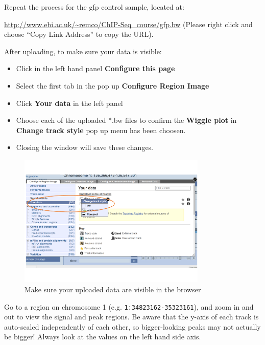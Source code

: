 \begin{steps}
Repeat the process for the gfp control sample, located at:

\url{http://www.ebi.ac.uk/~remco/ChIP-Seq_course/gfp.bw} (Please right click and choose ``Copy Link Address'' to copy the URL).

After uploading, to make sure your data is visible:
\begin{itemize}
	\item Click in the left hand panel \textbf{Configure this page}
        \item Select the first tab in the pop up \textbf{Configure Region Image}
        \item Click \textbf{Your data} in the left panel
        \item Choose each of the uploaded *.bw files to confirm the \textbf{Wiggle plot} in \textbf{Change track style} pop up menu has been choosen.
        \item Closing the window will save these changes.

\end{itemize}

\begin{figure}[H]
\centering
\includegraphics[width=0.8\textwidth]{ConfigureYourData.png}
\caption{Make sure your uploaded data are visible in the browser}
\label{fig:ConfigureYourData}
\end{figure}

Go to a region on chromosome 1 (e.g. \texttt{1:34823162-35323161}), and zoom in and out
to view the signal and peak regions. Be aware that the y-axis of each track is auto-scaled independently of each other,
so bigger-looking peaks may not actually be bigger! Always look at the values
on the left hand side axis.
\end{steps}

